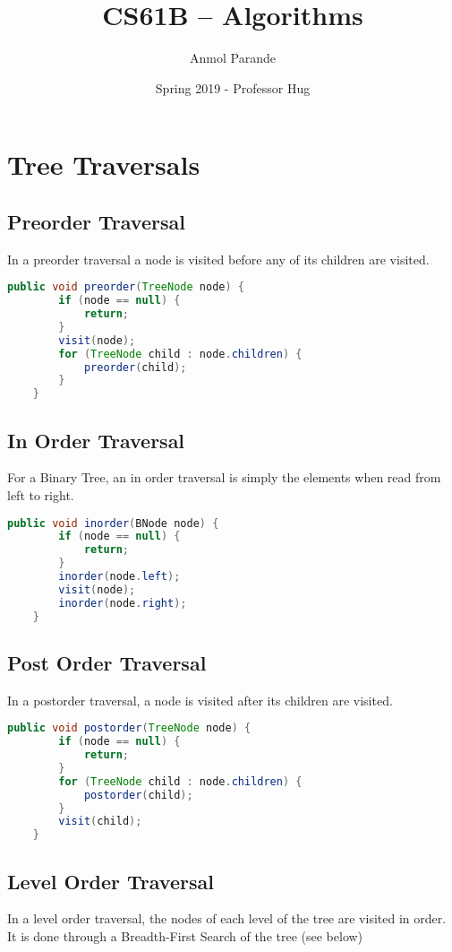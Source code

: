 \documentclass{article}
\begin{document}
    \title{CS61B -- Algorithms}
    \author{Anmol Parande}
    \date{Spring 2019 - Professor Hug}
    \maketitle

\section{Tree Traversals}
\subsection{Preorder Traversal}
In a preorder traversal a node is visited before any of its children are visited.
\begin{lstlisting}[language=Java]
    public void preorder(TreeNode node) {
        if (node == null) {
            return;
        }
        visit(node);
        for (TreeNode child : node.children) {
            preorder(child);
        }
    }
\end{lstlisting}
\subsection{In Order Traversal}
For a Binary Tree, an in order traversal is simply the elements when read from left to right.
\begin{lstlisting}[language=Java]
    public void inorder(BNode node) {
        if (node == null) {
            return;
        }
        inorder(node.left);
        visit(node);
        inorder(node.right);
    }
\end{lstlisting}
\subsection{Post Order Traversal}
In a postorder traversal, a node is visited after its children are visited.
\begin{lstlisting}[language=Java]
    public void postorder(TreeNode node) {
        if (node == null) {
            return;
        }
        for (TreeNode child : node.children) {
            postorder(child);
        }
        visit(child);
    }
\end{lstlisting}
\subsection{Level Order Traversal}
In a level order traversal, the nodes of each level of the tree are visited in order.
It is done through a Breadth-First Search of the tree (see below)
\end{document}
